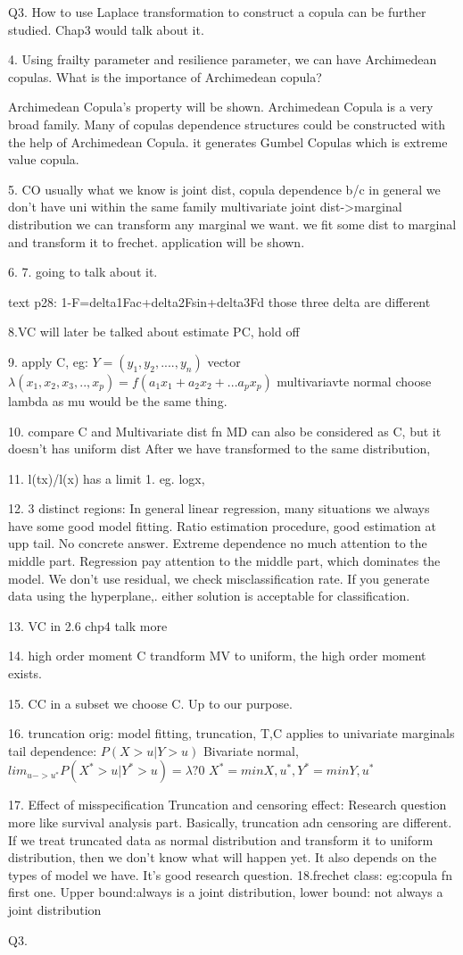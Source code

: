 \documentclass[a4paper,12pt]{texMemo}
\begin{document}
Q3. How to use Laplace transformation to construct a copula can be further studied. Chap3 would talk about it.

4. Using frailty parameter and resilience parameter, we can have Archimedean copulas. What is the importance of Archimedean copula?

Archimedean Copula's property will be shown. Archimedean Copula is a very broad family. Many of copulas dependence structures could be constructed with the help of Archimedean Copula. it generates Gumbel Copulas which is extreme value copula.

5. CO usually what we know is joint dist, 
copula dependence b/c in general we don't have uni within the same family
multivariate joint dist->marginal distribution
we can transform any marginal we want. 
we fit some dist to marginal and transform it to frechet. 
application will be shown.

6. 7. going to talk about it.

text p28: 1-F=delta1Fac+delta2Fsin+delta3Fd those three delta are different

8.VC will later be talked about
estimate PC, hold off


9. apply C, eg:
$Y=(y_1,y_2,....,y_n)$    vector $\lambda(x_1,x_2,x_3,..,x_p)=f(a_1x_1+a_2x_2+...a_px_p)$
multivariavte normal choose lambda as mu would be the same thing.

10. compare C and Multivariate dist fn
MD can also be considered as C, but it doesn't has uniform dist
After we have transformed to the same distribution, 

11. l(tx)/l(x) has a limit 1. eg. logx, 

12. 3 distinct regions:
In general linear regression, many situations we always have some good model fitting. 
Ratio estimation procedure, good estimation at upp tail.
No concrete answer.
Extreme dependence no much attention to the middle part.
Regression pay attention to the middle part, which dominates the model. 
We don't use residual, we check misclassification rate. 
If you generate data using the hyperplane,. either solution is acceptable for classification. 

13. VC in 2.6 chp4 talk more

14. high order moment
C trandform MV to uniform, the high order moment exists.

15. CC in a subset we choose C. Up to our purpose.

16. truncation 
orig: model fitting, truncation, 
T,C applies to univariate marginals 
tail dependence: $P(X>u|Y>u)$
Bivariate normal,  $lim_{u->u^*}P(X^*>u|Y^*>u)=\lambda?0$
$X^*=min{X,u^*},Y^*=min{Y,u^*}$   

17. Effect of misspecification
Truncation and censoring effect: Research question more like survival analysis part.
Basically, truncation adn censoring are different. If we treat truncated data as normal distribution and transform it to uniform distribution, then we don't know what will happen yet. It also depends on the types of model we have. It's good research question. 
18.frechet class:
eg:copula fn 
first one. 
Upper bound:always is a joint distribution, lower bound: not always a joint distribution

Q3.
\end{document}
